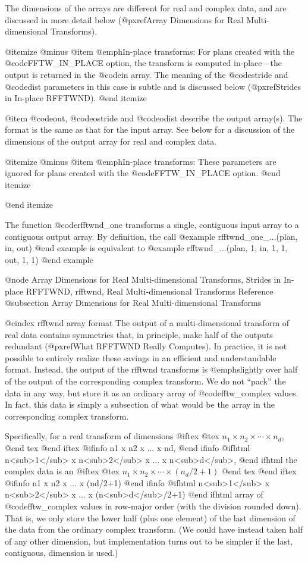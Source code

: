 The dimensions of the arrays are different for real and complex data,
and are discussed in more detail below (@pxref{Array Dimensions for Real
Multi-dimensional Transforms}).

@itemize @minus
@item @emph{In-place transforms}:
For plans created with the @code{FFTW_IN_PLACE} option, the transform is
computed in-place---the output is returned in the @code{in} array.  The
meaning of the @code{stride} and @code{dist} parameters in this case is
subtle and is discussed below (@pxref{Strides in In-place RFFTWND}).
@end itemize

@item
@code{out}, @code{ostride} and @code{odist} describe the output
array(s).  The format is the same as that for the input array.  See
below for a discussion of the dimensions of the output array for real
and complex data.

@itemize @minus
@item @emph{In-place transforms}:
These parameters are ignored for plans created with the
@code{FFTW_IN_PLACE} option.
@end itemize

@end itemize

The function @code{rfftwnd_one} transforms a single, contiguous input
array to a contiguous output array.  By definition, the call
@example
rfftwnd_one_...(plan, in, out)
@end example
is equivalent to
@example
rfftwnd_...(plan, 1, in, 1, 1, out, 1, 1)
@end example

@node Array Dimensions for Real Multi-dimensional Transforms, Strides in In-place RFFTWND, rfftwnd, Real Multi-dimensional Transforms Reference
@subsection Array Dimensions for Real Multi-dimensional Transforms

@cindex rfftwnd array format
The output of a multi-dimensional transform of real data contains
symmetries that, in principle, make half of the outputs redundant
(@pxref{What RFFTWND Really Computes}).  In practice, it is not
possible to entirely realize these savings in an efficient and
understandable format.  Instead, the output of the rfftwnd transforms is
@emph{slightly} over half of the output of the corresponding complex
transform.  We do not ``pack'' the data in any way, but store it as an
ordinary array of @code{fftw_complex} values.  In fact, this data is
simply a subsection of what would be the array in the corresponding
complex transform.

Specifically, for a real transform of dimensions
@iftex
@tex
$n_1 \times n_2 \times \cdots \times n_d$,
@end tex
@end iftex
@ifinfo
n1 x n2 x ... x nd,
@end ifinfo
@ifhtml
n<sub>1</sub> x n<sub>2</sub> x ... x n<sub>d</sub>,
@end ifhtml
the complex data is an
@iftex
@tex
$n_1 \times n_2 \times \cdots \times (n_d/2+1)$
@end tex
@end iftex
@ifinfo
n1 x n2 x ... x (nd/2+1)
@end ifinfo
@ifhtml
n<sub>1</sub> x n<sub>2</sub> x ... x (n<sub>d</sub>/2+1)
@end ifhtml
array of @code{fftw_complex} values in row-major order (with the
division rounded down).  That is, we only store the lower half (plus one
element) of the last dimension of the data from the ordinary complex
transform.  (We could have instead taken half of any other dimension,
but implementation turns out to be simpler if the last, contiguous,
dimension is used.)

